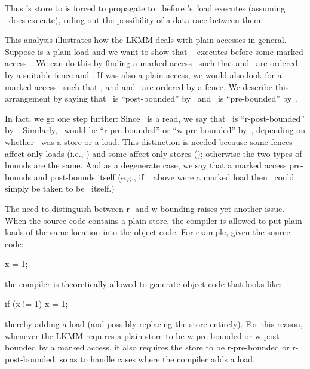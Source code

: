 Thus 's store to  is forced to propagate to~
before 's~load
executes (assuming ~does execute), ruling out the possibility of a
data race between them.

This analysis illustrates how the LKMM deals with plain accesses in
general.
Suppose  is a plain load and we want to show that ~%
executes before some marked access~.  We can do this by finding a
marked access~ such that  and~ are ordered by
a suitable fence and
.
If  was also a plain access, we would also look for a
marked access~ such that , and  and~
are ordered by a
fence.
We describe this arrangement by saying that ~is
``post-bounded'' by~ and ~is ``pre-bounded'' by~.

In fact, we go one step further:
Since ~is a read, we say that ~is
``r-post-bounded'' by~.
Similarly, ~would be ``r-pre-bounded'' or
``w-pre-bounded'' by~, depending on whether ~was a store or a load.
This distinction is needed because some fences affect only loads
(i.e., ) and some affect only stores (); otherwise
the two types of bounds are the same.
And as a degenerate case, we
say that a marked access pre-bounds and post-bounds itself (e.g., if ~%
above were a marked load then ~could simply be taken to be ~itself.)

The need to distinguish between r- and w-bounding raises yet another
issue.
When the source code contains a plain store, the compiler is
allowed to put plain loads of the same location into the object code.
For example, given the source code:

\begin{VerbatimU}
	x = 1;
\end{VerbatimU}

\noindent%
the compiler is theoretically allowed to generate object code that
looks like:

\begin{VerbatimU}
	if (x != 1)
		x = 1;
\end{VerbatimU}

\noindent%
thereby adding a load (and possibly replacing the store entirely).
For this reason, whenever the LKMM requires a plain store to be
w-pre-bounded or w-post-bounded by a marked access, it also requires
the store to be r-pre-bounded or r-post-bounded, so as to handle cases
where the compiler adds a load.

